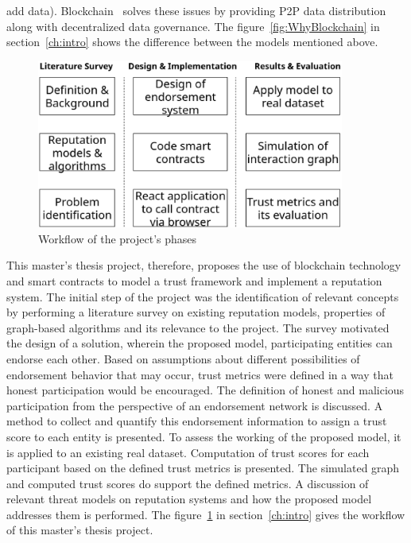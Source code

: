 add data). Blockchain~\cite{atzori2015blockchain} solves these issues by
providing P2P data distribution along with decentralized data governance. 
The figure~\ref{fig:WhyBlockchain} in section~\ref{ch:intro} shows the difference between the models mentioned above. \par
\begin{figure}
	\begin{center}
		\includegraphics[width=0.9\textwidth]{Images/workflow.eps}
		\caption{Workflow of the project's phases}
		\label{fig:thesisSteps}
	\end{center}
\end{figure}
This master’s thesis project, therefore, proposes the use of blockchain
technology and smart contracts to model a trust framework and implement a
reputation system. The initial step of the project was the identification of
relevant concepts by performing a literature survey on existing reputation
models, properties of graph-based algorithms and its relevance to the project.
The survey motivated the design of a solution, wherein the proposed model,
participating entities can endorse each other. Based on assumptions about
different possibilities of endorsement behavior that may occur, trust metrics
were defined in a way that honest participation would be encouraged. The
definition of honest and malicious participation from the perspective of an
endorsement network is discussed. A method to collect and quantify this
endorsement information to assign a trust score to each entity is presented. To
assess the working of the proposed model, it is applied to an existing real
dataset. Computation of trust scores for each participant based on the defined
trust metrics is presented. The simulated graph and computed trust scores do
support the defined metrics. A discussion of relevant threat models on
reputation systems and how the proposed model addresses them is performed. The
figure~\ref{fig:thesisSteps} in section~\ref{ch:intro} gives the workflow of
this master’s thesis project. \par

